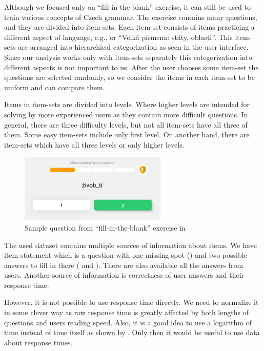 \documentclass[
  digital, %
  table,   %
  nolof,     %
  nolot,     %
  nocover,
  color,
  final, %
]{fithesis3}
\begin{document}
Although we focused only on ``fill-in-the-blank'' exercise, it can still be used to train various concepts of Czech grammar. The exercise contains many questions, and they are divided into item-sets. Each item-set consists of items practicing a different aspect of language, e.g., \cviceniB{} or ``Velká písmena: státy, oblasti''. This item-sets are arranged into hierarchical categorization as seen in the user interface. Since our analysis works only with item-sets separately this categorization into different aspects is not important to us. After the user chooses some item-set the questions are selected randomly, so we consider the items in each item-set to be uniform and can compare them.

Items in item-sets are divided into levels. Where higher levels are intended for solving by more experienced users as they contain more difficult questions. In general, there are three difficulty levels, but not all item-sets have all three of them. Some easy item-sets include only first level. On another hand, there are item-sets which have all three levels or only higher levels.

\begin{figure}
  \includegraphics[width=7cm]{img/umimecesky_doplnovacka}
  \caption{Sample question from ``fill-in-the-blank'' exercise in \umimeCesky{}}
  \label{fig:umimecesky_doplnovacka}
\end{figure}


The used dataset contains multiple sources of information about items. We have item statement which is a question with one missing spot () and two possible answers to fill in there ( and ). There are also available all the answers from users. Another source of information is correctness of user answers and their response time.

However, it is not possible to use response time directly. We need to normalize it in some clever way as raw response time is greatly affected by both lengths of questions and users reading speed. Also, it is a good idea to use a logarithm of time instead of time itself as shown by \citeauthor{niznan2014using}\cite{niznan2014using}. Only then it would be useful to use data about response times.
\end{document}
